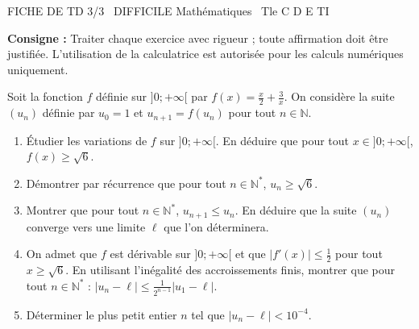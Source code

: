 \documentclass[11pt]{article}
\begin{document}
\begin{tcolorbox}[enhanced,colback=popink,colframe=popink,arc=10pt,boxrule=0pt,left=12pt,right=12pt,top=9pt,bottom=9pt]
{\color{white}\popxbold\small FICHE DE TD 3/3 \textbullet\ DIFFICILE \hfill Mathématiques \textbullet\ Tle C D E TI\par}
\end{tcolorbox}
\vspace{4pt}
\noindent \textbf{Consigne :} Traiter chaque exercice avec rigueur ; toute affirmation doit être justifiée. L'utilisation de la calculatrice est autorisée pour les calculs numériques uniquement.

\begin{exercice}
Soit la fonction $f$ définie sur $]0;+\infty[$ par $f(x)=\frac{x}{2}+\frac{3}{x}$. On considère la suite $(u_n)$ définie par $u_0=1$ et $u_{n+1}=f(u_n)$ pour tout $n\in\mathbb{N}$.
\begin{enumerate}
    \item Étudier les variations de $f$ sur $]0;+\infty[$. En déduire que pour tout $x\in]0;+\infty[$, $f(x)\geq \sqrt{6}$.
    \item Démontrer par récurrence que pour tout $n\in\mathbb{N}^*$, $u_n\geq \sqrt{6}$.
    \item Montrer que pour tout $n\in\mathbb{N}^*$, $u_{n+1}\leq u_n$. En déduire que la suite $(u_n)$ converge vers une limite $\ell$ que l'on déterminera.
    \item On admet que $f$ est dérivable sur $]0;+\infty[$ et que $|f'(x)|\leq \frac{1}{2}$ pour tout $x\geq \sqrt{6}$.
    En utilisant l'inégalité des accroissements finis, montrer que pour tout $n\in\mathbb{N}^*$ :
    $|u_n-\ell|\leq \frac{1}{2^{n-1}}|u_1-\ell|$.
    \item Déterminer le plus petit entier $n$ tel que $|u_n-\ell|<10^{-4}$.
\end{enumerate}
\end{exercice}
\end{document}

